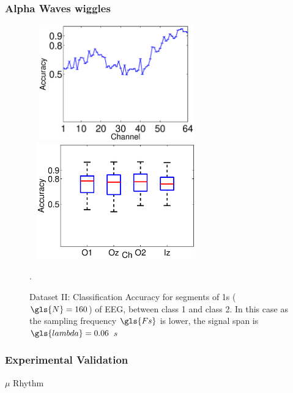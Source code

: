 \documentclass[aspectratio=169]{beamer}
\begin{document}
\begin{frame}
\frametitle{Alpha Waves wiggles}
\begin{figure}[h!]
\centering
\includegraphics[width=7.5cm, height=5cm]{images/DatasetPhysionetAccuracyPerChannel}
\includegraphics[width=7.5cm, height=5cm]{images/DatasetPhysionetBoxPlots}
\caption[PhysioNet Dataset Binary Classification Accuracy]{Dataset II: Classification Accuracy for segments of 1s ($\gls{N} = 160$) of EEG, between class 1 and class 2.  In this case as the sampling frequency $\gls{Fs}$ is lower, the signal span is $\gls{lambda} = 0.06$   $\si{s}$}.
\label{fig:alpharesultsdatasetii}
\end{figure}
\end{frame}

\begin{frame}
\frametitle{Experimental Validation}
\begin{center}
\LARGE $\mu$ Rhythm
\end{center}
\end{frame}
\end{document}
